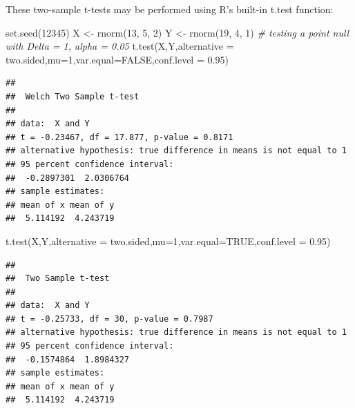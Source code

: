 \documentclass[
]{book}
\newenvironment{Shaded}{\begin{snugshade}}{\end{snugshade}}
\newcommand{\AttributeTok}[1]{\textcolor[rgb]{0.77,0.63,0.00}{#1}}
\newcommand{\CommentTok}[1]{\textcolor[rgb]{0.56,0.35,0.01}{\textit{#1}}}
\newcommand{\ConstantTok}[1]{\textcolor[rgb]{0.00,0.00,0.00}{#1}}
\newcommand{\DecValTok}[1]{\textcolor[rgb]{0.00,0.00,0.81}{#1}}
\newcommand{\FloatTok}[1]{\textcolor[rgb]{0.00,0.00,0.81}{#1}}
\newcommand{\FunctionTok}[1]{\textcolor[rgb]{0.00,0.00,0.00}{#1}}
\newcommand{\NormalTok}[1]{#1}
\newcommand{\OtherTok}[1]{\textcolor[rgb]{0.56,0.35,0.01}{#1}}
\newcommand{\StringTok}[1]{\textcolor[rgb]{0.31,0.60,0.02}{#1}}
\begin{document}
These two-sample t-tests may be performed using R's built-in t.test function:

\begin{Shaded}
\begin{Highlighting}[]
\FunctionTok{set.seed}\NormalTok{(}\DecValTok{12345}\NormalTok{)}
\NormalTok{X }\OtherTok{\textless{}{-}} \FunctionTok{rnorm}\NormalTok{(}\DecValTok{13}\NormalTok{, }\DecValTok{5}\NormalTok{, }\DecValTok{2}\NormalTok{)}
\NormalTok{Y }\OtherTok{\textless{}{-}} \FunctionTok{rnorm}\NormalTok{(}\DecValTok{19}\NormalTok{, }\DecValTok{4}\NormalTok{, }\DecValTok{1}\NormalTok{)}
\CommentTok{\# testing a point null with Delta = 1, alpha = 0.05}
\FunctionTok{t.test}\NormalTok{(X,Y,}\AttributeTok{alternative =} \StringTok{\textquotesingle{}two.sided\textquotesingle{}}\NormalTok{,}\AttributeTok{mu=}\DecValTok{1}\NormalTok{,}\AttributeTok{var.equal=}\ConstantTok{FALSE}\NormalTok{,}\AttributeTok{conf.level =} \FloatTok{0.95}\NormalTok{)}
\end{Highlighting}
\end{Shaded}

\begin{verbatim}
## 
##  Welch Two Sample t-test
## 
## data:  X and Y
## t = -0.23467, df = 17.877, p-value = 0.8171
## alternative hypothesis: true difference in means is not equal to 1
## 95 percent confidence interval:
##  -0.2897301  2.0306764
## sample estimates:
## mean of x mean of y 
##  5.114192  4.243719
\end{verbatim}

\begin{Shaded}
\begin{Highlighting}[]
\FunctionTok{t.test}\NormalTok{(X,Y,}\AttributeTok{alternative =} \StringTok{\textquotesingle{}two.sided\textquotesingle{}}\NormalTok{,}\AttributeTok{mu=}\DecValTok{1}\NormalTok{,}\AttributeTok{var.equal=}\ConstantTok{TRUE}\NormalTok{,}\AttributeTok{conf.level =} \FloatTok{0.95}\NormalTok{)}
\end{Highlighting}
\end{Shaded}

\begin{verbatim}
## 
##  Two Sample t-test
## 
## data:  X and Y
## t = -0.25733, df = 30, p-value = 0.7987
## alternative hypothesis: true difference in means is not equal to 1
## 95 percent confidence interval:
##  -0.1574864  1.8984327
## sample estimates:
## mean of x mean of y 
##  5.114192  4.243719
\end{verbatim}
\end{document}
